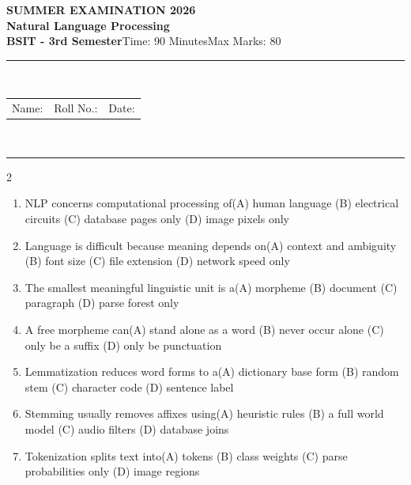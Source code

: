 \documentclass[a4paper]{article}
\makeatletter
\newcommand{\examheader}{%
\begin{center}\textbf{\large SUMMER EXAMINATION 2026}\\[-1pt]
\textbf{\normalsize Natural Language Processing}\\[-1pt]
\textbf{BSIT - 3rd Semester}\quad Time: 90 Minutes\quad Max Marks: 80\\[-1pt]
\textcolor{black!65}{\rule{\linewidth}{0.45pt}}\\[-2pt]
\begin{tabularx}{\linewidth}{@{}X X X@{}}Name: \hrulefill & Roll No.: \hrulefill & Date: \hrulefill\end{tabularx}\\[-1pt]
\textcolor{black!65}{\rule{\linewidth}{0.45pt}}\end{center}}
\makeatother
\begin{document}
\examheader
\raggedcolumns
\begin{multicols*}{2}
\fontsize{8.5}{10}\selectfont
\begin{enumerate}
\item NLP concerns computational processing of\newline\hspace*{0.6em}(A) human language \quad (B) electrical circuits \newline\hspace*{0.6em}(C) database pages only \quad (D) image pixels only
\item Language is difficult because meaning depends on\newline\hspace*{0.6em}(A) context and ambiguity \quad (B) font size \newline\hspace*{0.6em}(C) file extension \quad (D) network speed only
\item The smallest meaningful linguistic unit is a\newline\hspace*{0.6em}(A) morpheme \quad (B) document \newline\hspace*{0.6em}(C) paragraph \quad (D) parse forest only
\item A free morpheme can\newline\hspace*{0.6em}(A) stand alone as a word \quad (B) never occur alone \newline\hspace*{0.6em}(C) only be a suffix \quad (D) only be punctuation
\item Lemmatization reduces word forms to a\newline\hspace*{0.6em}(A) dictionary base form \quad (B) random stem \newline\hspace*{0.6em}(C) character code \quad (D) sentence label
\item Stemming usually removes affixes using\newline\hspace*{0.6em}(A) heuristic rules \quad (B) a full world model \newline\hspace*{0.6em}(C) audio filters \quad (D) database joins
\item Tokenization splits text into\newline\hspace*{0.6em}(A) tokens \quad (B) class weights \newline\hspace*{0.6em}(C) parse probabilities only \quad (D) image regions

\end{enumerate}
\end{multicols*}
\end{document}
